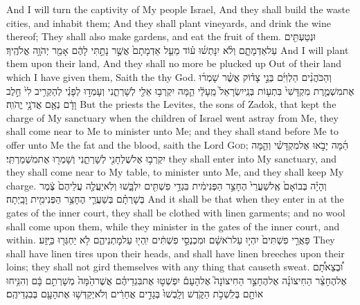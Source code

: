 {And I will turn the captivity of My people Israel, And they shall build the waste cities, and inhabit them; And they shall plant vineyards, and drink the wine thereof; They shall also make gardens, and eat the fruit of them.}
{וּנְטַעְתִּ֖ים עַל\maqqaf אַדְמָתָ֑ם וְלֹ֨א יִנָּתְשׁ֜וּ ע֗וֹד מֵעַ֤ל אַדְמָתָם֙ אֲשֶׁ֣ר נָתַ֣תִּי לָהֶ֔ם אָמַ֖ר יְהֹוָ֥ה אֱלֹהֶֽיךָ׃}
{And I will plant them upon their land, And they shall no more be plucked up Out of their land which I have given them, Saith the \lord\space thy God.}
\label{haft_31}
\setcounter{chap}{44}
\setcounter{verse}{15}
{וְהַכֹּהֲנִ֨ים הַלְוִיִּ֜ם בְּנֵ֣י צָד֗וֹק אֲשֶׁ֨ר שָׁמְר֜וּ אֶת\maqqaf מִשְׁמֶ֤רֶת מִקְדָּשִׁי֙ בִּתְע֤וֹת בְּנֵֽי\maqqaf יִשְׂרָאֵל֙ מֵֽעָלַ֔י הֵ֛מָּה יִקְרְב֥וּ אֵלַ֖י לְשָׁרְתֵ֑נִי וְעָמְד֣וּ לְפָנַ֗י לְהַקְרִ֥יב לִי֙ חֵ֣לֶב וָדָ֔ם נְאֻ֖ם אֲדֹנָ֥י יֱהֹוִֽה׃}
{But the priests the Levites, the sons of Zadok, that kept the charge of My sanctuary when the children of Israel went astray from Me, they shall come near to Me to minister unto Me; and they shall stand before Me to offer unto Me the fat and the blood, saith the Lord \textsc{God};}
{הֵ֜מָּה יָבֹ֣אוּ אֶל\maqqaf מִקְדָּשִׁ֗י וְהֵ֛מָּה יִקְרְב֥וּ אֶל\maqqaf שֻׁלְחָנִ֖י לְשָׁרְתֵ֑נִי וְשָׁמְר֖וּ אֶת\maqqaf מִשְׁמַרְתִּֽי׃}
{they shall enter into My sanctuary, and they shall come near to My table, to minister unto Me, and they shall keep My charge.}
{וְהָיָ֗ה בְּבוֹאָם֙ אֶֽל\maqqaf שַׁעֲרֵי֙ הֶחָצֵ֣ר הַפְּנִימִ֔ית בִּגְדֵ֥י פִשְׁתִּ֖ים יִלְבָּ֑שׁוּ וְלֹֽא\maqqaf יַעֲלֶ֤ה עֲלֵיהֶם֙ צֶ֔מֶר בְּשָׁרְתָ֗ם בְּשַׁעֲרֵ֛י הֶחָצֵ֥ר הַפְּנִימִ֖ית וָבָֽיְתָה׃}
{And it shall be that when they enter in at the gates of the inner court, they shall be clothed with linen garments; and no wool shall come upon them, while they minister in the gates of the inner court, and within.}
{פַּאֲרֵ֤י פִשְׁתִּים֙ יִהְי֣וּ עַל\maqqaf רֹאשָׁ֔ם וּמִכְנְסֵ֣י פִשְׁתִּ֔ים יִֽהְי֖וּ עַל\maqqaf מׇתְנֵיהֶ֑ם לֹ֥א יַחְגְּר֖וּ בַּיָּֽזַע׃}
{They shall have linen tires upon their heads, and shall have linen breeches upon their loins; they shall not gird themselves with any thing that causeth sweat.}
{וּ֠בְצֵאתָ֠ם אֶל\maqqaf הֶחָצֵ֨ר הַחִיצוֹנָ֜ה אֶל\maqqaf הֶחָצֵ֣ר הַחִיצוֹנָה֮ אֶל\maqqaf הָעָם֒ יִפְשְׁט֣וּ אֶת\maqqaf בִּגְדֵיהֶ֗ם אֲשֶׁר\maqqaf הֵ֙מָּה֙ מְשָׁרְתִ֣ם בָּ֔ם וְהִנִּ֥יחוּ אוֹתָ֖ם בְּלִֽשְׁכֹ֣ת הַקֹּ֑דֶשׁ וְלָֽבְשׁוּ֙ בְּגָדִ֣ים אֲחֵרִ֔ים וְלֹא\maqqaf יְקַדְּשׁ֥וּ אֶת\maqqaf הָעָ֖ם בְּבִגְדֵיהֶֽם׃}
